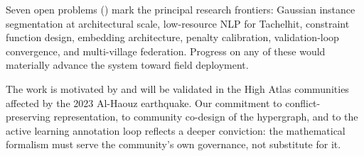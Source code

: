 \documentclass[11pt,a4paper]{article}
\theoremstyle{plain}
\theoremstyle{definition}
\theoremstyle{remark}
\begin{document}
Seven open problems () mark the principal research
frontiers: Gaussian instance segmentation at architectural scale,
low-resource NLP for Tachelhit, constraint function design, embedding
architecture, penalty calibration, validation-loop convergence, and
multi-village federation. Progress on any of these would materially
advance the system toward field deployment.

The work is motivated by and will be validated in the High Atlas
communities affected by the 2023 Al-Haouz earthquake. Our commitment
to conflict-preserving representation, to community co-design of the
hypergraph, and to the active learning annotation loop reflects a
deeper conviction: the mathematical formalism must serve the community's
own governance, not substitute for it.

\printbibliography
\end{document}
